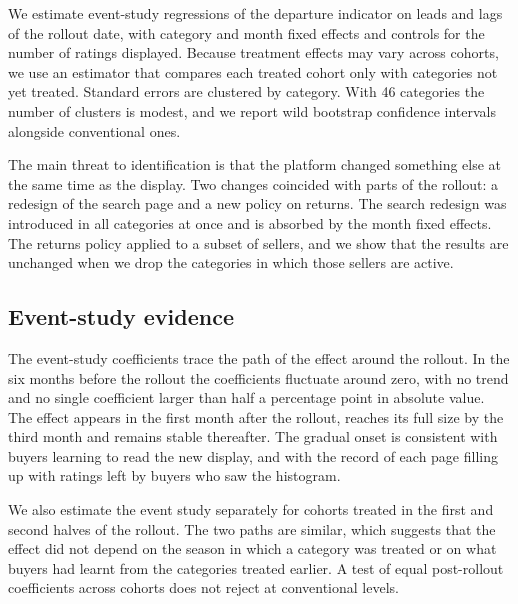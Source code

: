 \documentclass[12pt]{article}
\begin{document}
We estimate event-study regressions of the departure indicator on leads and lags of the rollout date, with category and month fixed effects and controls for the number of ratings displayed. Because treatment effects may vary across cohorts, we use an estimator that compares each treated cohort only with categories not yet treated. Standard errors are clustered by category. With 46 categories the number of clusters is modest, and we report wild bootstrap confidence intervals alongside conventional ones.

The main threat to identification is that the platform changed something else at the same time as the display. Two changes coincided with parts of the rollout: a redesign of the search page and a new policy on returns. The search redesign was introduced in all categories at once and is absorbed by the month fixed effects. The returns policy applied to a subset of sellers, and we show that the results are unchanged when we drop the categories in which those sellers are active.

\subsection{Event-study evidence}
The event-study coefficients trace the path of the effect around the rollout. In the six months before the rollout the coefficients fluctuate around zero, with no trend and no single coefficient larger than half a percentage point in absolute value. The effect appears in the first month after the rollout, reaches its full size by the third month and remains stable thereafter. The gradual onset is consistent with buyers learning to read the new display, and with the record of each page filling up with ratings left by buyers who saw the histogram.

We also estimate the event study separately for cohorts treated in the first and second halves of the rollout. The two paths are similar, which suggests that the effect did not depend on the season in which a category was treated or on what buyers had learnt from the categories treated earlier. A test of equal post-rollout coefficients across cohorts does not reject at conventional levels.
\end{document}
